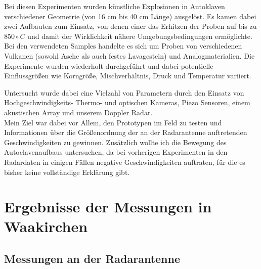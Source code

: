 \documentclass[12pt,a4paper]{scrartcl}
\begin{document}
Bei diesen Experimenten wurden künstliche Explosionen in Autoklaven \citep{Spieler:2004fk} verschiedener Geometrie (von 16 cm bis 40 cm Länge) ausgelöst. Es kamen dabei zwei Aufbauten zum Einsatz, von denen einer das Erhitzen der Proben auf bis zu $850\circ C$ und damit der Wirklichkeit nähere Umgebungsbedingungen ermöglichte. Bei den verwendeten Samples handelte es sich um Proben von verschiedenen Vulkanen (sowohl Asche als auch festes Lavagestein) und Analogmaterialien.
Die Experimente wurden wiederholt durchgeführt und dabei potentielle Einflussgrößen wie Korngröße, Mischverhältnis, Druck und Temperatur variiert.

Untersucht wurde dabei eine Vielzahl von Parametern durch den Einsatz von Hochgeschwindigkeits- Thermo- und optischen Kameras, Piezo Sensoren, einem akustischen Array und unserem Doppler Radar.\\

Mein Ziel war dabei vor Allem, den Prototypen im Feld zu testen und Informationen über die Größenordnung der an der Radarantenne auftretenden Geschwindigkeiten zu gewinnen. Zusätzlich wollte ich die Bewegung des Autoclavenaufbaus untersuchen, da bei vorherigen Experimenten in den Radardaten in einigen Fällen negative Geschwindigkeiten auftraten, für die es bisher keine vollständige Erklärung gibt. 


\section{Ergebnisse der Messungen in Waakirchen}



\subsection{Messungen an der Radarantenne}
\end{document}
